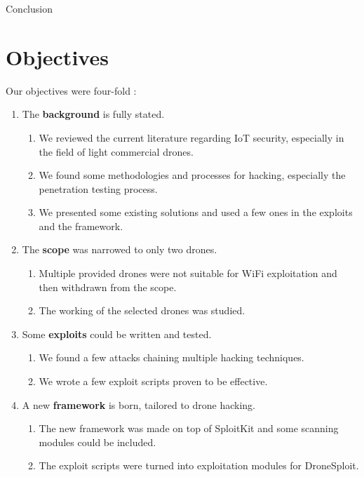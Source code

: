 \begin{chaptercover}{Conclusion}
\section{Objectives}
Our objectives were four-fold :
{\hyphenation{}
\begin{enumerate}[itemsep=0.1cm,topsep=0.1cm]
  \item The \textbf{background} is fully stated.
  \begin{enumerate}[label=\Alph* --,align=left,itemsep=.05cm,topsep=0.1cm]
    \item We reviewed the current literature regarding IoT security, especially in the field of light commercial drones.
    \item We found some methodologies and processes for hacking, especially the penetration testing process.
    \item We presented some existing solutions and used a few ones in the exploits and the framework.
  \end{enumerate}
  \item The \textbf{scope} was narrowed to only two drones.
  \begin{enumerate}[label=\Alph* --,align=left,itemsep=.05cm,topsep=0.1cm]
    \item Multiple provided drones were not suitable for WiFi exploitation and then withdrawn from the scope.
    \item The working of the selected drones was studied.
  \end{enumerate}
  \item Some \textbf{exploits} could be written and tested.
  \begin{enumerate}[label=\Alph* --,align=left,itemsep=.05cm,topsep=0.1cm]
    \item We found a few attacks chaining multiple hacking techniques.
    \item We wrote a few exploit scripts proven to be effective.
  \end{enumerate}
  \item A new \textbf{framework} is born, tailored to drone hacking.
  \begin{enumerate}[label=\Alph* --,align=left,itemsep=.05cm,topsep=0.1cm]
    \item The new framework was made on top of SploitKit and some scanning modules could be included.
    \item The exploit scripts were turned into exploitation modules for DroneSploit.
  \end{enumerate}
\end{enumerate}}


\end{chaptercover}
